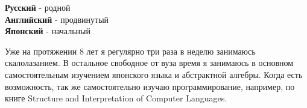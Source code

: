 \documentclass[9pt]{developercv} %
\begin{document}

\begin{minipage}[t]{0.3\textwidth}
	\vspace{-\baselineskip} %


	\textbf{Русский} - родной\\
	\textbf{Английский} - продвинутый\\
	\textbf{Японский} - начальный
\end{minipage}
\hfill
\begin{minipage}[t]{0.6\textwidth}
	\vspace{-\baselineskip} %


    Уже на протяжении 8 лет я регулярно три раза в неделю занимаюсь скалолазанием. В остальное свободное от вуза время я занимаюсь в основном самостоятельным изучением японского языка и абстрактной алгебры. Когда есть возможность, так же самостоятельно изучаю программирование, например, по книге Structure and Interpretation of Computer Languages.
\end{minipage}

\end{document}
